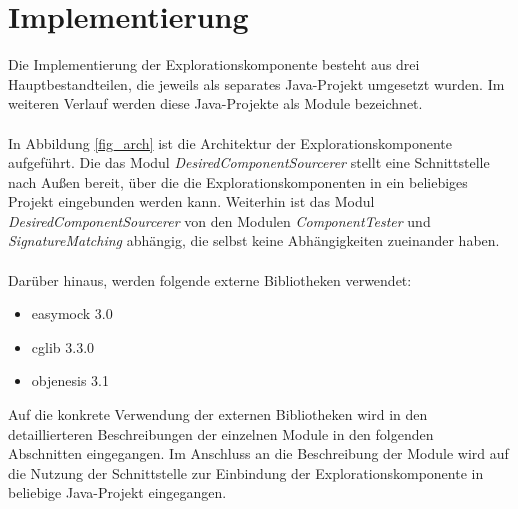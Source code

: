 \chapter{Implementierung}
Die Implementierung der Explorationskomponente besteht aus drei Hauptbestandteilen, die jeweils als separates Java-Projekt umgesetzt wurden. Im weiteren Verlauf werden diese Java-Projekte als Module bezeichnet.
\\\\
In Abbildung \ref{fig_arch} ist die Architektur der Explorationskomponente aufgeführt. Die das Modul \emph{DesiredComponentSourcerer} stellt eine Schnittstelle nach Außen bereit, über die die Explorationskomponenten in ein beliebiges Projekt eingebunden werden kann. Weiterhin ist das Modul \emph{DesiredComponentSourcerer} von den Modulen \emph{ComponentTester} und \emph{SignatureMatching} abhängig, die selbst keine Abhängigkeiten zueinander haben.
\\\\
Darüber hinaus, werden folgende externe Bibliotheken verwendet:
\begin{itemize}
\item easymock 3.0 \cite{easymock}
\item cglib 3.3.0 \cite{cglib}
\item objenesis 3.1 \cite{objenesis}
\end{itemize}
Auf die konkrete Verwendung der externen Bibliotheken wird in den detaillierteren Beschreibungen der einzelnen Module in den folgenden Abschnitten eingegangen. Im Anschluss an die Beschreibung der Module wird auf die Nutzung der Schnittstelle zur Einbindung der Explorationskomponente in beliebige Java-Projekt eingegangen.
